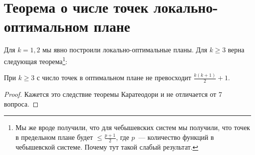 \section{Теорема о числе точек локально-оптимальном плане}

Для $k=1,2$ мы явно построили локально-оптимальные планы. Для $k\geq 3$ верна следующая теорема\footnote{Мы же вроде получили, что для чебышевских систем мы получили, что точек в предельном плане будет $\leq \frac{p+1}{2}$, где $p$ — количество функций в чебышевской системе. Почему тут такой слабый результат.}:

\begin{thm}
При $k \geq 3$ с число точек в оптимальном плане не превосходит $\frac{k(k+1)}{2}+1$.
\end{thm}
 
 \begin{proof}
 Кажется это следствие теоремы Каратеодори и не отличается от 7 вопроса. 
 \end{proof}